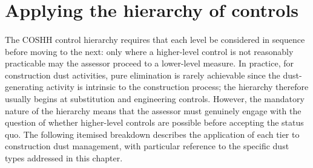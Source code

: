 \section{Applying the hierarchy of controls}

\paragraph{}
The COSHH control hierarchy requires that each level be considered in sequence before moving to the next: only where a higher-level control is not reasonably practicable may the assessor proceed to a lower-level measure. In practice, for construction dust activities, pure elimination is rarely achievable since the dust-generating activity is intrinsic to the construction process; the hierarchy therefore usually begins at substitution and engineering controls. However, the mandatory nature of the hierarchy means that the assessor must genuinely engage with the question of whether higher-level controls are possible before accepting the status quo. The following itemised breakdown describes the application of each tier to construction dust management, with particular reference to the specific dust types addressed in this chapter.

